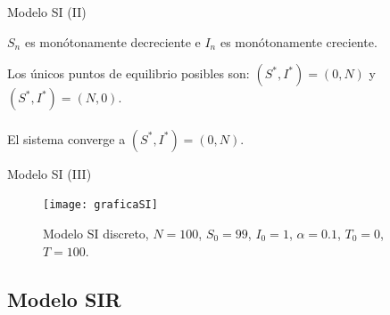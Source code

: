 \begin{frame}{Modelo SI (II)}

    \begin{lema}
        $S_n$ es monótonamente decreciente e $I_n$ es monótonamente creciente.
    \end{lema}

    \pause

    Los únicos puntos de equilibrio posibles son: $(S^*,I^*)=(0,N)$ y $(S^*,I^*)=(N,0)$.
    \\~\\
    El sistema converge a $(S^*,I^*)=(0,N)$.

\end{frame}


\begin{frame}{Modelo SI (III)}
    \begin{figure}
        \begin{center}
        \caption{Modelo SI discreto, $N=100$, $S_0=99$, $I_0 = 1$, $\alpha = 0.1$, $T_0 = 0$, $T = 100$.}
        \texttt{[image: graficaSI]}
        \end{center}
    \end{figure}
\end{frame}


\subsection{Modelo SIR}


